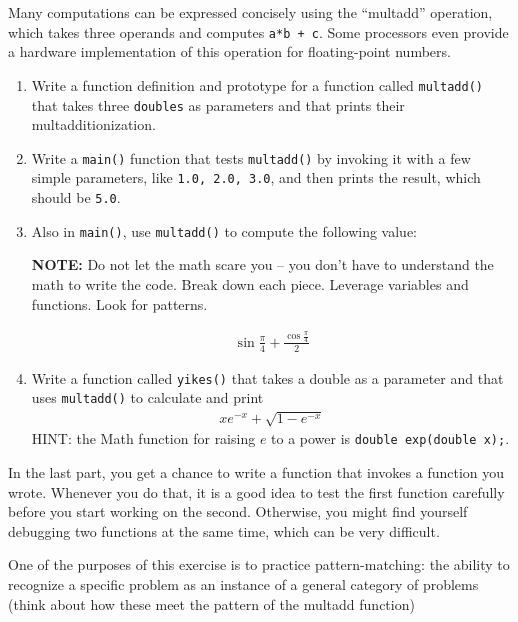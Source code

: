 \begin{exercise}
\label{ex.multadd}

Many computations can be expressed concisely using the ``multadd''
operation, which takes three operands and computes {\tt a*b + c}.  Some
processors even provide a hardware implementation of this operation for
floating-point numbers.

\begin{enumerate}

\item Write a function definition and prototype for a function called {\tt multadd()} that takes three {\tt doubles}
as parameters and that prints their multadditionization.

\item Write a {\tt main()} function that tests {\tt multadd()} by invoking it with a
few simple parameters, like {\tt 1.0, 2.0, 3.0}, and then prints
the result, which should be {\tt 5.0}.

\item Also in {\tt main()}, use {\tt multadd()} to compute the
following value:


{\bf NOTE:} Do not let the math scare you -- you don't have to understand the math to write the code.
Break down each piece. Leverage variables and functions. Look for patterns.

%
\begin{eqnarray*}
& \sin \frac{\pi}{4} + \frac{\cos \frac{\pi}{4}}{2} & 
\end{eqnarray*}
%
\item Write a function called {\tt yikes()} that takes a
double as a parameter and that uses {\tt multadd()} to calculate
and print
%
\begin{eqnarray*}
x e^{-x} + \sqrt{1 - e^{-x}}
\end{eqnarray*}
%
HINT: the Math function for raising $e$ to a power is {\tt double exp(double x);}.

\end{enumerate}

In the last part, you get a chance to write a function that invokes
a function you wrote.  Whenever you do that, it is a good idea to
test the first function carefully before you start working on the
second.  Otherwise, you might find yourself debugging two functions
at the same time, which can be very difficult.

One of the purposes of this exercise is to practice pattern-matching:
the ability to recognize a specific problem as an instance of a
general category of problems (think about how these meet the pattern of the multadd function)


\end{exercise}